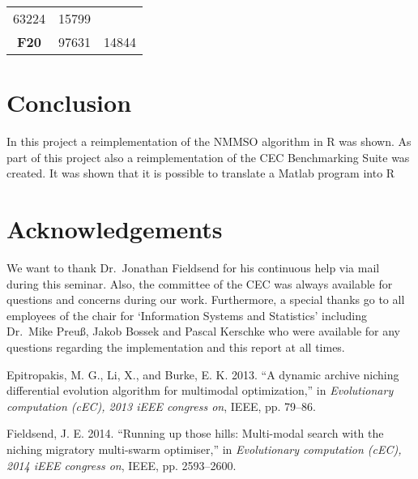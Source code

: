 \documentclass[12pt,a4paper]{article}
\begin{document}
\begin{longtable}[c]{@{}crr@{}}
\begin{minipage}[t]{0.09\columnwidth}\raggedleft\strut
63224
\strut\end{minipage} &
\begin{minipage}[t]{0.25\columnwidth}\raggedleft\strut
15799
\strut\end{minipage}\tabularnewline
\begin{minipage}[t]{0.13\columnwidth}\centering\strut
\textbf{F20}
\strut\end{minipage} &
\begin{minipage}[t]{0.09\columnwidth}\raggedleft\strut
97631
\strut\end{minipage} &
\begin{minipage}[t]{0.25\columnwidth}\raggedleft\strut
14844
\strut\end{minipage}\tabularnewline
\bottomrule
\end{longtable}

\section{Conclusion}\label{conclusion}

In this project a reimplementation of the NMMSO algorithm in R was
shown. As part of this project also a reimplementation of the CEC
Benchmarking Suite was created. It was shown that it is possible to
translate a Matlab program into R

\section{Acknowledgements}\label{acknowledgements}

We want to thank Dr.~Jonathan Fieldsend for his continuous help via mail
during this seminar. Also, the committee of the CEC was always available
for questions and concerns during our work. Furthermore, a special
thanks go to all employees of the chair for `Information Systems and
Statistics' including Dr.~Mike Preuß, Jakob Bossek and Pascal Kerschke
who were available for any questions regarding the implementation and
this report at all times. \newpage

\hypertarget{refs}{}
\hypertarget{ref-epitropakisux5f2013}{}
Epitropakis, M. G., Li, X., and Burke, E. K. 2013. ``A dynamic archive
niching differential evolution algorithm for multimodal optimization,''
in \emph{Evolutionary computation (cEC), 2013 iEEE congress on}, IEEE,
pp. 79--86.

\hypertarget{ref-fieldsendux5f2014}{}
Fieldsend, J. E. 2014. ``Running up those hills: Multi-modal search with
the niching migratory multi-swarm optimiser,'' in \emph{Evolutionary
computation (cEC), 2014 iEEE congress on}, IEEE, pp. 2593--2600.
\end{document}
